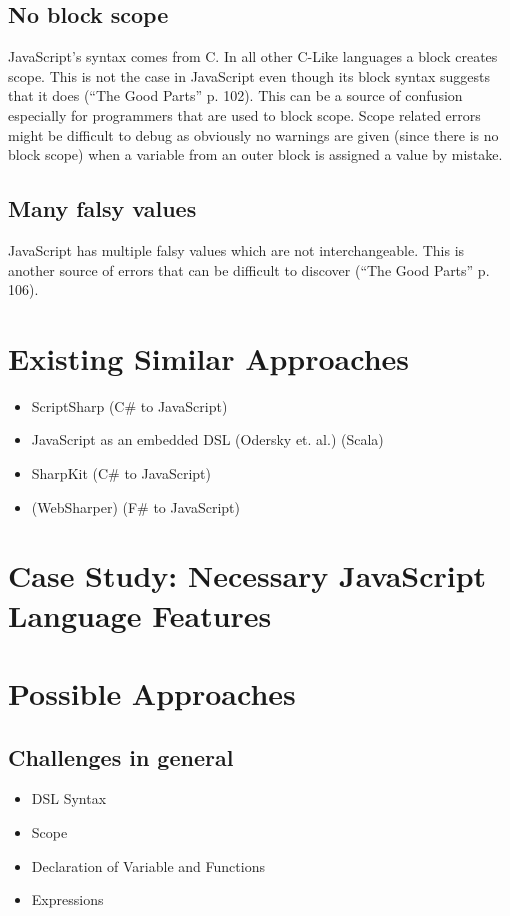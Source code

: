 	\subsection{No block scope}
		JavaScript’s syntax comes from C. In all other C-Like languages a block creates scope. This is not the case in JavaScript even though its block syntax suggests that it does (“The Good Parts” p. 102). This can be a source of confusion especially for programmers that are used to block scope. Scope related errors might be difficult to debug as obviously no warnings are given (since there is no block scope) when a variable from an outer block is assigned a value by mistake.

	\subsection{Many falsy values}
		JavaScript has multiple falsy values which are not interchangeable. This is another source of errors that can be difficult to discover (“The Good Parts” p. 106).

\section{Existing Similar Approaches}
	\begin{itemize}
		\item ScriptSharp (C\# to JavaScript)
		\item JavaScript as an embedded DSL (Odersky et. al.) (Scala)
		\item SharpKit (C\# to JavaScript)
		\item (WebSharper) (F\# to JavaScript)
	\end{itemize}



\section{Case Study: Necessary JavaScript Language Features}

\section{Possible Approaches}
	\subsection{Challenges in general}
		\begin{itemize}
			\item DSL Syntax
			\item Scope
			\item Declaration of Variable and Functions
			\item Expressions
		\end{itemize}

